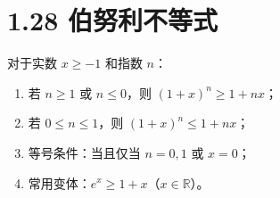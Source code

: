 \documentclass{article}
\begin{document}
\section*{1.28 伯努利不等式}
对于实数 \( x \geq -1 \) 和指数 \( n \)：
\begin{enumerate}
    \item 若 \( n \geq 1 \) 或 \( n \leq 0 \)，则 \( (1+x)^n \geq 1+nx \)；
    \item 若 \( 0 \leq n \leq 1 \)，则 \( (1+x)^n \leq 1+nx \)；
    \item 等号条件：当且仅当 \( n=0,1 \) 或 \( x=0 \)；
    \item 常用变体：\( e^x \geq 1+x \)（\( x\in\mathbb{R} \)）。
\end{enumerate}
\end{document}
